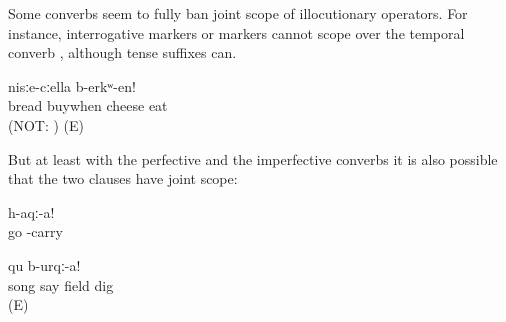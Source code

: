 Some converbs seem to fully ban joint scope of illocutionary operators. For instance, interrogative markers  or  markers  cannot scope over the temporal converb , although tense suffixes can. 
%
\begin{exe}
	\ex	\label{ex:‎When you buy bread, eat it with cheese!}
	\gll	[t'ult'	asː-ib=qːel]		nisːe-cːella	b-erkʷ-en!\\
		bread	buywhen	cheese	eat\\
	\glt	{} (NOT: ) (E)
\end{exe}

But at least with the perfective and the imperfective converbs it is also possible that the two clauses have joint scope:
%
\begin{exe}
	\ex	\label{ex:Go and bring it}
	\gll	[ag-ur-re]	h-aqː-a!\\
		go	-carry\\
	\glt	{}

	\ex	\label{ex:‎Sing a song and dig the field}
	\gll	[dalaj	Ø-ik'-ul]	qu	b-urqː-a!\\
		song	say	field	dig\\
	\glt	{} (E)
\end{exe}

